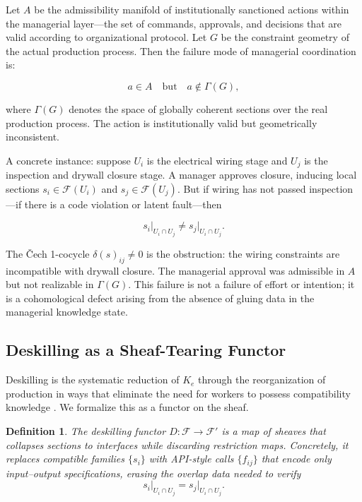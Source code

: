 \documentclass[12pt]{article}
\newtheorem{definition}{Definition}
\begin{document}
Let $A$ be the admissibility manifold of institutionally sanctioned actions within the managerial layer---the set of commands, approvals, and decisions that are valid according to organizational protocol. Let $G$ be the constraint geometry of the actual production process. Then the failure mode of managerial coordination is:

\begin{equation}
a \in A \quad \text{but} \quad a \notin \Gamma(G),
\end{equation}

where $\Gamma(G)$ denotes the space of globally coherent sections over the real production process. The action is institutionally valid but geometrically inconsistent.

A concrete instance: suppose $U_i$ is the electrical wiring stage and $U_j$ is the inspection and drywall closure stage. A manager approves closure, inducing local sections $s_i \in \mathcal{F}(U_i)$ and $s_j \in \mathcal{F}(U_j)$. But if wiring has not passed inspection---if there is a code violation or latent fault---then

\[
s_i\big|_{U_i \cap U_j} \neq s_j\big|_{U_i \cap U_j}.
\]

The Čech 1-cocycle $\delta(s)_{ij} \neq 0$ is the obstruction: the wiring constraints are incompatible with drywall closure. The managerial approval was admissible in $A$ but not realizable in $\Gamma(G)$. This failure is not a failure of effort or intention; it is a cohomological defect arising from the absence of gluing data in the managerial knowledge state.

\subsection{Deskilling as a Sheaf-Tearing Functor}

Deskilling is the systematic reduction of $K_e$ through the reorganization of production in ways that eliminate the need for workers to possess compatibility knowledge \cite{Braverman1974}. We formalize this as a functor on the sheaf.

\begin{definition}
The \emph{deskilling functor} $D: \mathcal{F} \to \mathcal{F}'$ is a map of sheaves that collapses sections to interfaces while discarding restriction maps. Concretely, it replaces compatible families $\{s_i\}$ with API-style calls $\{f_{ij}\}$ that encode only input--output specifications, erasing the overlap data needed to verify
\[
s_i\big|_{U_i \cap U_j} = s_j\big|_{U_i \cap U_j}.
\]
\end{definition}
\end{document}

